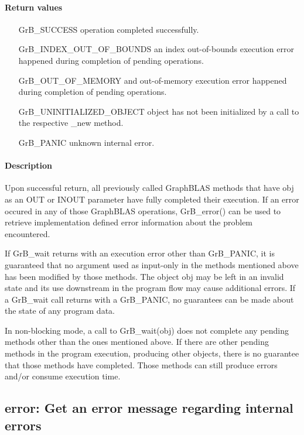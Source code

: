 \paragraph{Return values}
\begin{itemize}[leftmargin=2.3in]
	\item[{\sf GrB\_SUCCESS}]			operation completed successfully.
	\item[{\sf GrB\_INDEX\_OUT\_OF\_BOUNDS}]	an index out-of-bounds execution error happened during completion of pending operations.
	\item[{\sf GrB\_OUT\_OF\_MEMORY}]		and out-of-memory execution error happened during completion of pending operations.
	\item[{\sf GrB\_UNINITIALIZED\_OBJECT}]		object has not been initialized by a call to the respective {\sf *\_new} method.
	\item[{\sf GrB\_PANIC}]				unknown internal error.
\end{itemize}

\paragraph{Description}

Upon successful return, all previously called GraphBLAS methods that
have {\sf obj} as an {\sf OUT} or {\sf INOUT} parameter have fully
completed their execution.
If an
error occured in any of those GraphBLAS operations, {\sf GrB\_error()}
can be used to retrieve implementation defined error information about
the problem encountered.

If {\sf GrB\_wait} returns with an execution error other than {\sf
GrB\_PANIC}, it is guaranteed that no argument used as input-only in the
methods mentioned above has been modified by those methods. The object
{\sf obj} may be left in an invalid state and its use downstream in
the program flow may cause additional errors. If a {\sf GrB\_wait}
call returns with a {\sf GrB\_PANIC}, no guarantees can be made about
the state of any program data.

In non-blocking mode, a call to {\sf GrB\_wait(obj)} does not complete
any pending methods other than the ones mentioned above.
If there are other pending methods
in the program execution, producing other objects, there is no guarantee that
those methods have completed. Those methods can still produce errors
and/or consume execution time.

\subsection{{\sf error}: Get an error message regarding internal errors}
\label{Sec:GrB_error}

